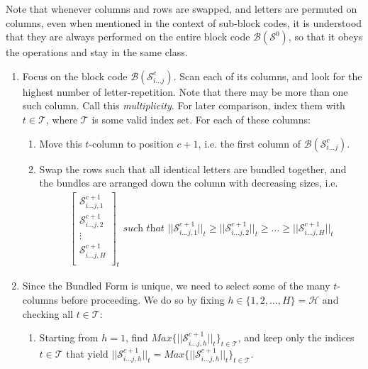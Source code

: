 \documentclass[12pt]{article}  %
\begin{document}
Note that whenever columns and rows are swapped, and letters are permuted on columns, even when mentioned in the context of sub-block codes, it is understood that they are always performed on the entire block code $\mathcal{B}(\mathcal{S}^0)$, so that it obeys the operations and stay in the same class.


\begin{enumerate}
\item Focus on the block code $\mathcal{B}(\mathcal{S}^c_{i \dots j})$. Scan each of its columns, and look for the highest number of letter-repetition. Note that there may be more than one such column. Call this \emph{multiplicity}. For later comparison, index them with $t \in \mathcal{T}$, where $\mathcal{T}$ is some valid index set. For each of these columns:

\begin{enumerate}
\item Move this $t$-column to position $c+1$, i.e. the first column of $\mathcal{B}(\mathcal{S}^c_{i \dots j})$.
\item Swap the rows such that all identical letters are bundled together, and the bundles are arranged down the column with decreasing sizes, i.e.
\begin{align}\label{eq:col}
\left[\begin{array}{c}
\mathcal{S}^{c+1}_{i \dots j,1}\\
\mathcal{S}^{c+1}_{i \dots j,2}\\
\vdots \\
\mathcal{S}^{c+1}_{i \dots j,H}\\
\end{array}\right]_t
\textit{ such that \ }
||\mathcal{S}^{c+1}_{i \dots j,1}||_t \geq
||\mathcal{S}^{c+1}_{i \dots j,2}||_t \geq
\dots \geq
||\mathcal{S}^{c+1}_{i \dots j,H}||_t
\end{align}

\end{enumerate}


\item Since the Bundled Form is unique, we need to select some of the many $t$-columns before proceeding. We do so by fixing $h \in \{1,2,\dots,H\} = \mathcal{H}$ and checking all $t \in \mathcal{T}$:

\begin{enumerate}
\item Starting from $h=1$, find $Max \{||\mathcal{S}^{c+1}_{i \dots j,h}||_t\}_{t\in\mathcal{T}}$, and keep only the indices $t \in \mathcal{T}$ that yield $||\mathcal{S}^{c+1}_{i \dots j,h}||_t = Max \{||\mathcal{S}^{c+1}_{i \dots j,h}||_t\}_{t\in\mathcal{T}}$.


\end{enumerate}
\end{enumerate}
\end{document}
